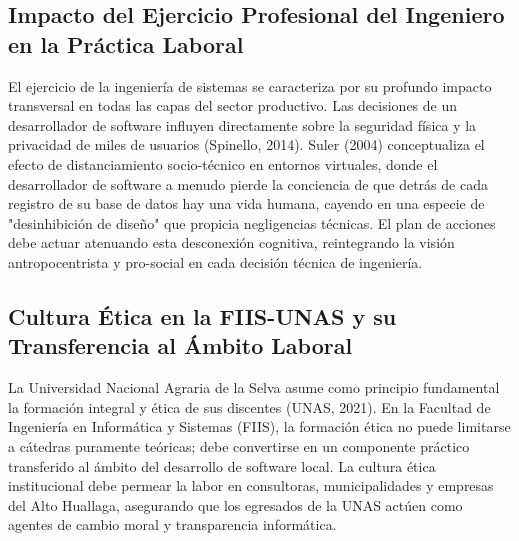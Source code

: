 \documentclass[12pt,a4paper]{article}
\begin{document}
\subsection{Impacto del Ejercicio Profesional del Ingeniero en la Práctica Laboral}
El ejercicio de la ingeniería de sistemas se caracteriza por su profundo impacto transversal en todas las capas del sector productivo. Las decisiones de un desarrollador de software influyen directamente sobre la seguridad física y la privacidad de miles de usuarios (Spinello, 2014). Suler (2004) conceptualiza el efecto de distanciamiento socio-técnico en entornos virtuales, donde el desarrollador de software a menudo pierde la conciencia de que detrás de cada registro de su base de datos hay una vida humana, cayendo en una especie de "desinhibición de diseño" que propicia negligencias técnicas. El plan de acciones debe actuar atenuando esta desconexión cognitiva, reintegrando la visión antropocentrista y pro-social en cada decisión técnica de ingeniería.

\subsection{Cultura Ética en la FIIS-UNAS y su Transferencia al Ámbito Laboral}
La Universidad Nacional Agraria de la Selva asume como principio fundamental la formación integral y ética de sus discentes (UNAS, 2021). En la Facultad de Ingeniería en Informática y Sistemas (FIIS), la formación ética no puede limitarse a cátedras puramente teóricas; debe convertirse en un componente práctico transferido al ámbito del desarrollo de software local. La cultura ética institucional debe permear la labor en consultoras, municipalidades y empresas del Alto Huallaga, asegurando que los egresados de la UNAS actúen como agentes de cambio moral y transparencia informática.
\end{document}
